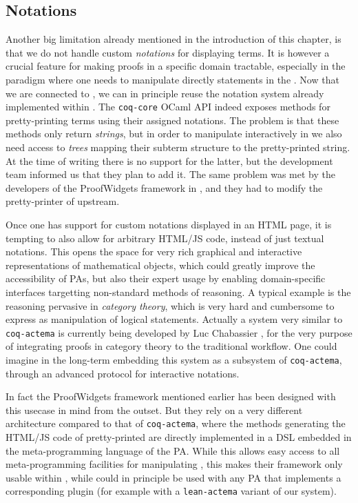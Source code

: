 \subsection{Notations}

Another big limitation already mentioned in the introduction of this chapter, is
that we do not handle custom \emph{notations} for displaying
terms. It is however a crucial feature for making proofs in a specific
domain tractable, especially in the  paradigm where one needs to
manipulate directly statements in the . Now that we are connected to , we
can in principle reuse the notation system already implemented within . The
\texttt{coq-core} OCaml API indeed exposes methods for pretty-printing  terms
using their assigned notations. The problem is that these methods only return
\emph{strings}, but in order to manipulate  interactively in  we also
need access to \emph{trees} mapping their subterm structure to the
pretty-printed string. At the time of writing there is no support for the
latter, but the  development team informed us that they plan to add it. The
same problem was met by the developers of the ProofWidgets framework in ,
and they had to modify the pretty-printer of  upstream.

Once one has support for custom notations displayed in an HTML page, it is
tempting to also allow for arbitrary HTML/JS code, instead of just textual
notations. This opens the space for very rich graphical and interactive
representations of mathematical objects, which could greatly improve the
accessibility of PAs, but also their expert usage by enabling domain-specific
interfaces targetting non-standard methods of reasoning. A typical example is
the \emph{} reasoning pervasive in \emph{category theory}, which is
very hard and cumbersome to express as manipulation of logical statements.
Actually a system very similar to \texttt{coq-actema} is currently being
developed by Luc Chabassier \cite{LucTalk}, for the very purpose of integrating
 proofs in category theory to the traditional  workflow.
One could imagine in the long-term embedding this system as a subsystem of
\texttt{coq-actema}, through an advanced protocol for interactive notations.

In fact the ProofWidgets framework mentioned earlier has been designed with this
usecase in mind from the outset. But they rely on a very different architecture
compared to that of \texttt{coq-actema}, where the methods generating the
HTML/JS code of pretty-printed  are directly implemented in a DSL embedded
in the meta-programming language of the PA. While this allows easy access to all
meta-programming facilities for manipulating , this makes their framework
only usable within , while  could in principle be used with any PA
that implements a corresponding plugin (for example with a \texttt{lean-actema}
variant of our system).


